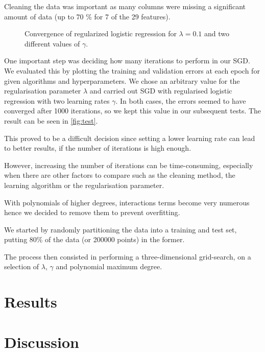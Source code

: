 \documentclass[10pt,conference,compsocconf]{IEEEtran}
\begin{document}

Cleaning the data was important as many columns were missing a significant amount of data (up to 70 \% for 7 of the 29 features).

\begin{figure}
  \centering
  
  \vspace{-3mm}
  \caption{Convergence of regularized logistic regression for $\lambda = 0.1$ and two
  different values of $\gamma$.}
  \label{fig:test}
\end{figure}


One important step was deciding how many iterations to perform in our
SGD. We evaluated this by plotting the training and validation errors
at each epoch for given algorithms and hyperparameters.
We chose an arbitrary value for the regularisation parameter $\lambda$ and carried out SGD with regularised logistic regression with two learning rates $\gamma$.
In both cases, the errors seemed to have converged after 1000 iterations, so we kept this value in our subsequent tests.
The result can
be seen in \autoref{fig:test}.

This proved to be a difficult decision since setting a lower learning rate can lead to better results,
if the number of iterations is high enough.

However, increasing the number of iterations can be
time-consuming, especially when there are other
factors to compare such as the cleaning method, the learning algorithm or 
the regularisation parameter.


With polynomials of higher degrees, interactions terms become very numerous hence we decided to remove them
to prevent overfitting.


We started by randomly partitioning the data into a training and test set,
putting 80\% of the data (or 200000 points) in the former.

The process then consisted in performing a three-dimensional grid-search, on a selection of $\lambda$, $\gamma$ and polynomial maximum degree.
\section{Results}

\section{Discussion}
\end{document}
